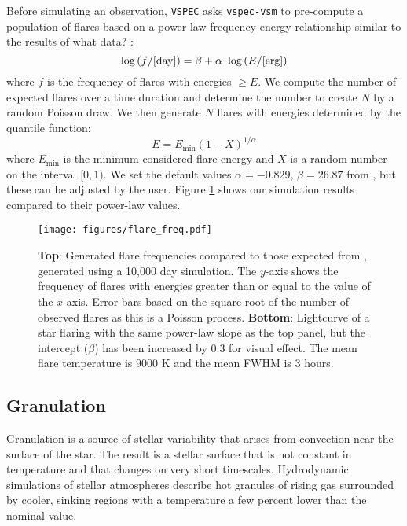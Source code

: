 \documentclass[twocolumn]{aastex631}
\newcommand{\TJ}[1]{\textcolor{tedcommentcolor}{#1}}
\newcommand{\vspec}[1]{\texttt{VSPEC}#1}
\begin{document}
Before simulating an observation, \vspec{} asks \texttt{vspec-vsm} to pre-compute a population of flares based on a power-law frequency-energy relationship similar to the results of \TJ{what data?} \citep{gao2022}:
\begin{equation} \label{eq:flare_freq}
    \log{(f/{\rm [day]})} = \beta + \alpha~\log{(E/{\rm [erg]})}
\end{equation}
where $f$ is the frequency of flares with energies $\ge E$. We compute the number of expected flares over a time duration and determine the number to create $N$ by a random Poisson draw. We then generate $N$ flares with energies determined by the quantile function:
\begin{equation}
    E = E_{\text{min}} (1-X)^{1/\alpha}
\end{equation}
where $E_{\text{min}}$ is the minimum considered flare energy and $X$ is a random number on the interval $[0,1)$. We set the default values $\alpha=-0.829$, $\beta=26.87$ from \citet{gao2022}, but these can be adjusted by the user. Figure \ref{fig:flare_freq} shows our simulation results compared to their power-law values.

\begin{figure}
    \centering
    \texttt{[image: figures/flare\_freq.pdf]}
    \caption{
        {\bf Top}: Generated flare frequencies compared to those expected from \citet{gao2022}, generated using a 10,000 day simulation. The $y$-axis shows the frequency of flares with energies greater than or equal to the value of the $x$-axis. Error bars based on the square root of the number of observed flares as this is a Poisson process. {\bf Bottom}: Lightcurve of a star flaring with the same power-law slope as the top panel, but the intercept ($\beta$) has been increased by 0.3 for visual effect. The mean flare temperature is $9000$ K and the mean FWHM is $3$ hours.
        }
    \label{fig:flare_freq}
\end{figure}

\subsection{Granulation}
Granulation is a source of stellar variability that arises from convection near the surface of the star. The result is a stellar surface that is not constant in temperature and that changes on very short timescales. Hydrodynamic simulations of stellar atmospheres \citep[e.g.][]{magic2014} describe hot granules of rising gas surrounded by cooler, sinking regions with a temperature a few percent lower than the nominal value. 
\end{document}

